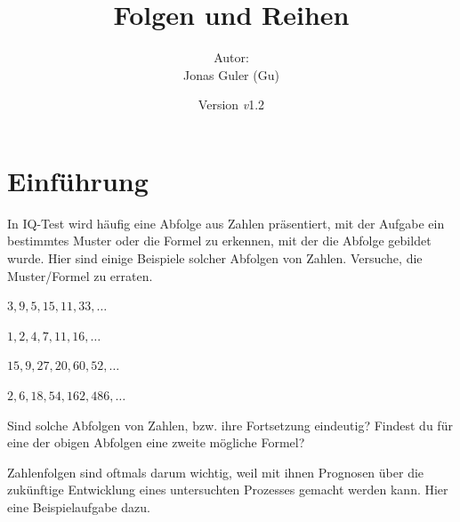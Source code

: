 \documentclass[11pt,oneside]{article}
\newcommand{\Skriptname}{Folgen und Reihen}
\newcommand{\Autor}{Jonas Guler (Gu)}
\newcommand{\version}{\textit{v}1.2}
\begin{document}
\begin{titlepage}
	\clearpage
	\title{\Huge\textbf{\Skriptname} \\[1cm]}
	\author{Autor:\\ \Autor}
	\date{\normalsize {Version \version}\\ \datelong}
	\maketitle
	\thispagestyle{empty}
	\vfill
	\tableofcontents
\end{titlepage}
\section{Einführung}
	\begin{aufgabe}
		In IQ-Test wird häufig eine Abfolge aus Zahlen präsentiert, mit der Aufgabe ein bestimmtes Muster oder die Formel zu erkennen, mit der die Abfolge gebildet wurde. Hier sind einige Beispiele solcher Abfolgen von Zahlen. Versuche, die Muster/Formel zu erraten.
		\begin{enumcols}[2]
			\item $3,9,5,15,11,33,\ldots$\vspace*{11pt}\\
			\item $1,2,4,7,11,16,\ldots$\vspace*{11pt}\\
			\item $15,9,27,20,60,52,\ldots$\vspace*{11pt}\\
			\item $2,6,18,54,162,486,\ldots$\vspace*{11pt}\\
		\end{enumcols}
		Sind solche Abfolgen von Zahlen, bzw. ihre Fortsetzung eindeutig? Findest du für eine der obigen Abfolgen eine zweite mögliche Formel?\\[5pt]
	\end{aufgabe}
	Zahlenfolgen sind oftmals darum wichtig, weil mit ihnen Prognosen über die zukünftige Entwicklung eines untersuchten Prozesses gemacht werden kann. Hier eine Beispielaufgabe dazu.
\end{document}
